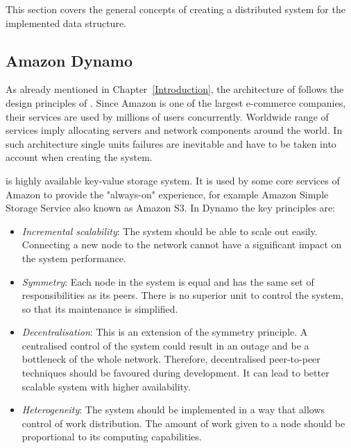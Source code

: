     This section covers the general concepts of creating a distributed system for the implemented data structure. 

    \subsection{Amazon Dynamo}
        As already mentioned in Chapter~\ref{Introduction}, the architecture of \DHTS follows the design principles of \Dynamo. 
        Since Amazon is one of the largest e-commerce companies, their services are used by millions of users concurrently.
        Worldwide range of services imply allocating servers and network components around the world.
        In such architecture single units failures are inevitable and have to be taken into account when creating the system.
        
        \Dynamo is highly available key-value storage system.
        It is used by some core services of Amazon to provide the "always-on" experience, for example Amazon Simple Storage Service \cite{AmazonS3} also known as Amazon S3.
        In Dynamo the key principles are:
        
        \begin{itemize}
            \item \textit{Incremental scalability}:
                The system should be able to scale out easily.
                Connecting a new node to the network cannot have a significant impact on the system performance.
            \item \textit{Symmetry}:
                Each node in the system is equal and has the same set of responsibilities as its peers. 
                There is no superior unit to control the system, so that its maintenance is simplified.
            \item \textit{Decentralisation}:
                This is an extension of the symmetry principle.
                A centralised control of the system could result in an outage and be a bottleneck of the whole network.
                Therefore, decentralised peer-to-peer techniques should be favoured during development.
                It can lead to better scalable system with higher availability.
            \item \textit{Heterogeneity}:
                The system should be implemented in a way that allows control of work distribution. 
                The amount of work given to a node should be proportional to its computing capabilities.
        \end{itemize}

